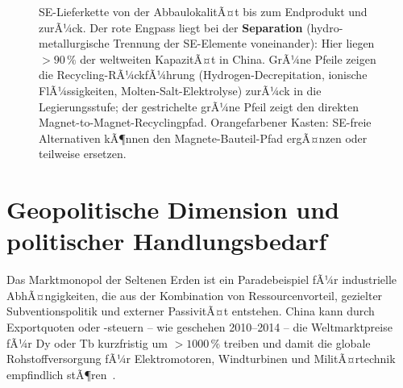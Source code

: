 ﻿\documentclass[12pt, a4paper]{report}
\theoremstyle{definition}
\theoremstyle{remark}
\begin{document}
\begin{figure}
\caption{SE-Lieferkette von der AbbaulokalitÃ¤t bis zum Endprodukt und zurÃ¼ck.
  Der rote Engpass liegt bei der \textbf{Separation} (hydro-metallurgische
  Trennung der SE-Elemente voneinander): Hier liegen $>90\,\%$ der weltweiten
  KapazitÃ¤t in China. GrÃ¼ne Pfeile zeigen die Recycling-RÃ¼ckfÃ¼hrung
  (Hydrogen-Decrepitation, ionische FlÃ¼ssigkeiten, Molten-Salt-Elektrolyse)
  zurÃ¼ck in die Legierungsstufe; der gestrichelte grÃ¼ne Pfeil zeigt den
  direkten Magnet-to-Magnet-Recyclingpfad. Orangefarbener Kasten: SE-freie
  Alternativen kÃ¶nnen den Magnete-Bauteil-Pfad ergÃ¤nzen oder teilweise
  ersetzen.}
\label{fig:re_lieferkette}
\end{figure}

\section{Geopolitische Dimension und politischer Handlungsbedarf}
\label{ssec:re_geopolitik}

Das Marktmonopol der Seltenen Erden ist ein Paradebeispiel fÃ¼r industrielle
AbhÃ¤ngigkeiten, die aus der Kombination von Ressourcenvorteil, gezielter
Subventionspolitik und externer PassivitÃ¤t entstehen. China kann durch
Exportquoten oder -steuern -- wie geschehen 2010--2014 -- die Weltmarktpreise
fÃ¼r Dy oder Tb kurzfristig um $>1000\,\%$ treiben und damit die globale
Rohstoffversorgung fÃ¼r Elektromotoren, Windturbinen und MilitÃ¤rtechnik
empfindlich stÃ¶ren~\cite{massari2013}.
\end{document}
